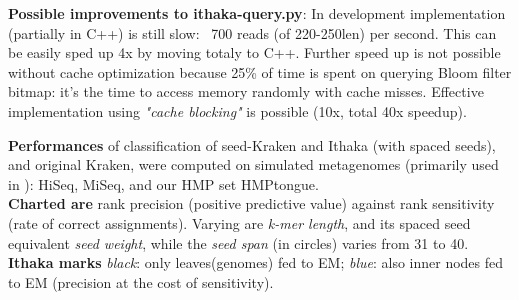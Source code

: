 \documentclass[portrait,final,a0paper,fontscale=0.277]{baposter}
\begin{document}
\begin{poster}
{\begin{minipage}{0.46\textwidth}
%
{\bf Possible improvements to ithaka-query.py}:
In development implementation (partially in C++) is still slow: ~700 reads (of 220-250len) per second. This can be easily sped up 4x by moving totaly to C++.
Further speed up is not possible without cache optimization because 25\% of time is spent on querying Bloom filter bitmap: it's the time to access memory randomly with cache misses. Effective implementation using {\em "cache blocking"} is possible (10x, total 40x speedup).
% 
% 


{\bf Performances} of classification of {\sc seed-Kraken}\cite{sseed} and {\sc Ithaka} (with spaced seeds), and original {\sc Kraken}, 
were computed on simulated metagenomes (primarily used in \cite{kraken}):    
    HiSeq, MiSeq, and our HMP set HMPtongue.\\
    {\bf Charted are} rank precision (positive predictive value) against rank sensitivity (rate of correct assignments). Varying are {\em k-mer length}, and its spaced seed equivalent {\em seed weight}, while the {\em seed span} (in circles) varies from 31 to 40.
{\bf Ithaka marks} {\em black}: only leaves(genomes) fed to EM; {\em blue}: also inner nodes fed to EM (precision at the cost of sensitivity).
    

\end{minipage}}
\end{poster}
\end{document}
